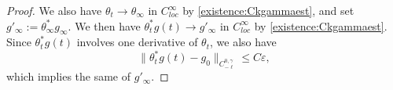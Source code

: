 \documentclass[12pt]{amsart}
\newcommand{\calM}{\mathcal{M}}
\renewcommand{\1}{{\mathbf 1}}
\newcommand{\eps}{{\varepsilon}}
\theoremstyle{others}
\numberwithin{equation}{section}
\begin{document}
\begin{proof}
We also have $\theta_t \to \theta_\infty$ in $C^\infty_{loc}$ by \eqref{existence:Ckgammaest}, and set $g'_\infty := \theta_\infty^* g_\infty.$ We then have $\theta_t^*g(t) \to g'_\infty$ in $C^\infty_{loc}$ by \eqref{existence:Ckgammaest}. Since $\theta_t^*g(t)$ involves one derivative of $\theta_t$, we also have
$$\| \theta_t^*g(t) - g_0 \|_{C^{0, \gamma}_{-\ell}} \leq C \eps,$$
which implies the same of $g'_\infty.$

\end{proof}



    
    
\end{document}
